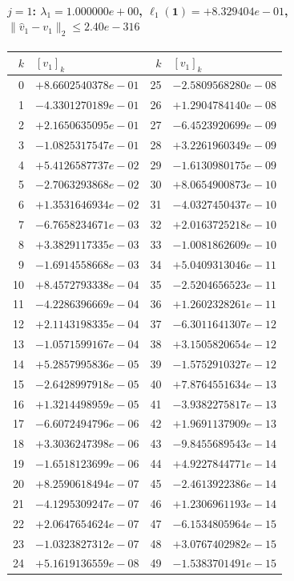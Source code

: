 \paragraph{$j = 1$: $\lambda_{1} = 1.000000e+00$, \quad $\ell_{1}(\mathbf{1}) = +8.329404e-01$, \quad $\|\hat{v}_{1} - v_{1}\|_2 \leq 2.40e-316$}
\begin{center}
{\footnotesize
\begin{tabular}{r@{\;\;}l@{\quad}r@{\;\;}l}
\toprule
$k$ & $[v_{1}]_k$ & $k$ & $[v_{1}]_k$ \\
\midrule
0 & $+8.6602540378e-01$ & 25 & $-2.5809568280e-08$ \\
1 & $-4.3301270189e-01$ & 26 & $+1.2904784140e-08$ \\
2 & $+2.1650635095e-01$ & 27 & $-6.4523920699e-09$ \\
3 & $-1.0825317547e-01$ & 28 & $+3.2261960349e-09$ \\
4 & $+5.4126587737e-02$ & 29 & $-1.6130980175e-09$ \\
5 & $-2.7063293868e-02$ & 30 & $+8.0654900873e-10$ \\
6 & $+1.3531646934e-02$ & 31 & $-4.0327450437e-10$ \\
7 & $-6.7658234671e-03$ & 32 & $+2.0163725218e-10$ \\
8 & $+3.3829117335e-03$ & 33 & $-1.0081862609e-10$ \\
9 & $-1.6914558668e-03$ & 34 & $+5.0409313046e-11$ \\
10 & $+8.4572793338e-04$ & 35 & $-2.5204656523e-11$ \\
11 & $-4.2286396669e-04$ & 36 & $+1.2602328261e-11$ \\
12 & $+2.1143198335e-04$ & 37 & $-6.3011641307e-12$ \\
13 & $-1.0571599167e-04$ & 38 & $+3.1505820654e-12$ \\
14 & $+5.2857995836e-05$ & 39 & $-1.5752910327e-12$ \\
15 & $-2.6428997918e-05$ & 40 & $+7.8764551634e-13$ \\
16 & $+1.3214498959e-05$ & 41 & $-3.9382275817e-13$ \\
17 & $-6.6072494796e-06$ & 42 & $+1.9691137909e-13$ \\
18 & $+3.3036247398e-06$ & 43 & $-9.8455689543e-14$ \\
19 & $-1.6518123699e-06$ & 44 & $+4.9227844771e-14$ \\
20 & $+8.2590618494e-07$ & 45 & $-2.4613922386e-14$ \\
21 & $-4.1295309247e-07$ & 46 & $+1.2306961193e-14$ \\
22 & $+2.0647654624e-07$ & 47 & $-6.1534805964e-15$ \\
23 & $-1.0323827312e-07$ & 48 & $+3.0767402982e-15$ \\
24 & $+5.1619136559e-08$ & 49 & $-1.5383701491e-15$ \\
\bottomrule
\end{tabular}
}
\end{center}


